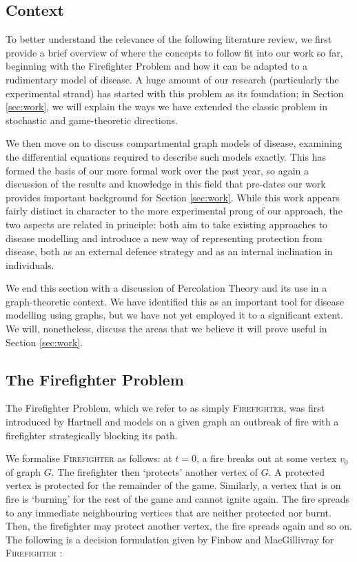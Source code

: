\documentclass[../report.tex]{subfiles}
\begin{document}
\subsection{Context}

To better understand the relevance of the following literature review, we first provide a brief overview of where the concepts to follow fit into our work so far, beginning with the Firefighter Problem and how it can be adapted to a rudimentary model of disease. A huge amount of our research (particularly the experimental strand) has started with this problem as its foundation; in Section \ref{sec:work}, we will explain the ways we have extended the classic problem in stochastic and game-theoretic directions.

We then move on to discuss compartmental graph models of disease, examining the differential equations required to describe such models exactly. This has formed the basis of our more formal work over the past year, so again a discussion of the results and knowledge in this field that pre-dates our work provides important background for Section \ref{sec:work}. While this work appears fairly distinct in character to the more experimental prong of our approach, the two aspects are related in principle: both aim to take existing approaches to disease modelling and introduce a new way of representing protection from disease, both as an external defence strategy and as an internal inclination in individuals.

We end this section with a discussion of Percolation Theory and its use in a graph-theoretic context. We have identified this as an important tool for disease modelling using graphs, but we have not yet employed it to a significant extent. We will, nonetheless, discuss the areas that we believe it will prove useful in Section \ref{sec:work}.

\subsection{The Firefighter Problem}

The Firefighter Problem, which we refer to as simply {\scshape Firefighter}, was first introduced by Hartnell \cite{hartnell_1995} and models on a given graph an outbreak of fire with a firefighter strategically blocking its path.

We formalise {\scshape Firefighter} as follows: at $t=0$, a fire breaks out at some vertex $v_0$ of graph $G$. The firefighter then `protects' another vertex of $G$. A protected vertex is protected for the remainder of the game. Similarly, a vertex that is on fire is `burning' for the rest of the game and cannot ignite again. The fire spreads to any immediate neighbouring vertices that are neither protected nor burnt. Then, the firefighter may protect another vertex, the fire spreads again and so on. The following is a decision formulation given by Finbow and MacGillivray for {\scshape Firefighter} \cite{finbow_2009}:
\vspace{1mm}
\end{document}
